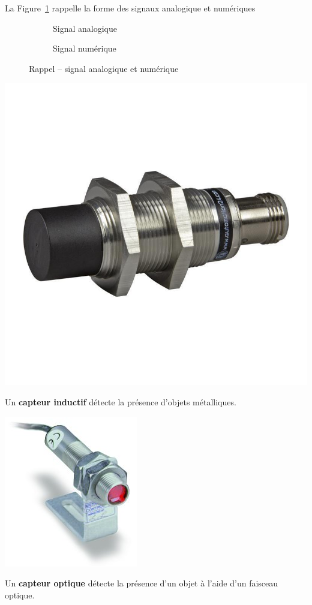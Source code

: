 La Figure~\ref{fig:analogVsNum} rappelle la forme des signaux analogique et numériques

\begin{figure}[ht]
\centering
\begin{subfigure}{0.49\textwidth}
\centering
	
	\caption{Signal analogique}
\end{subfigure}%
%
\begin{subfigure}{0.49\textwidth}
\centering
	
	\caption{Signal numérique}
\end{subfigure}
%
	\caption{Rappel -- signal analogique et numérique}
	\label{fig:analogVsNum}
\end{figure}

\pagebreak
\begin{UPSTIactivite}


	 \begin{minipage}[t]{.45\textwidth}
	\begin{center}
		\includegraphics[width=.4\textwidth,height=.4\textheight,keepaspectratio]{images/capt_inductif}
	\end{center}


		Un \textbf{capteur inductif} détecte la présence d'objets métalliques.
	\end{minipage}\hfill
	\begin{minipage}[t]{.45\textwidth}
	\begin{center}
		\includegraphics[width=.4\textwidth,height=.3\textheight,keepaspectratio]{images/capt_optique}
	\end{center}
		Un \textbf{capteur optique} détecte la présence d'un objet à l'aide d'un faisceau optique.
	\end{minipage}


\end{UPSTIactivite}
